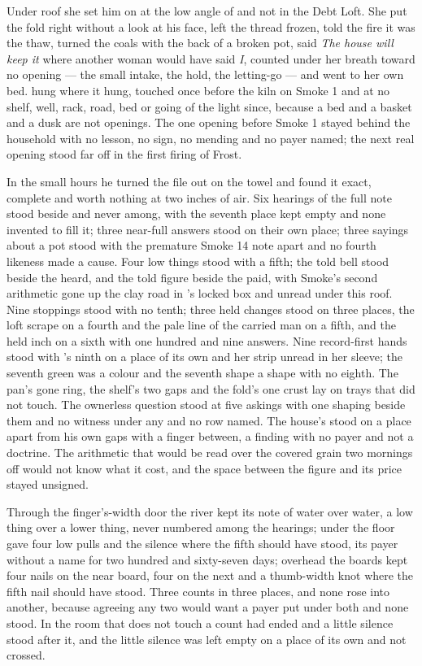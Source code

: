 Under  roof she set him on  at the low angle of  and not in the Debt Loft. She put the fold right without a look at his face, left the thread frozen, told the fire it was the thaw, turned the coals with the back of a broken pot, said \emph{The house will keep it} where another woman would have said \emph{I}, counted under her breath toward no opening --- the small intake, the hold, the letting-go --- and went to her own bed.  hung where it hung, touched once before the kiln on Smoke 1 and at no shelf, well, rack, road, bed or going of the light since, because a bed and a basket and a dusk are not openings. The one opening before Smoke 1 stayed behind the household with no lesson, no sign, no mending and no payer named; the next real opening stood far off in the first firing of Frost.

In the small hours he turned the file out on the towel and found it exact, complete and worth nothing at two inches of air. Six hearings of the full note stood beside and never among, with the seventh place kept empty and none invented to fill it; three near-full answers stood on their own place; three sayings about a pot stood with the premature Smoke 14 note apart and no fourth likeness made a cause. Four low things stood with  a fifth; the told bell stood beside the heard, and the told figure beside the paid, with Smoke's second arithmetic gone up the clay road in 's locked box and unread under this roof. Nine stoppings stood with no tenth; three held changes stood on three places, the loft scrape on a fourth and the pale line of the carried man on a fifth, and the held inch on a sixth with one hundred and nine answers. Nine record-first hands stood with 's ninth on a place of its own and her strip unread in her sleeve; the seventh green was a colour and the seventh shape a shape with no eighth. The pan's gone ring, the shelf's two gaps and the fold's one crust lay on trays that did not touch. The ownerless question stood at five askings with one shaping beside them and no witness under any and no row named. The house's  stood on a place apart from his own gaps with a finger between, a finding with no payer and not a doctrine. The arithmetic that would be read over the covered grain two mornings off would not know what it cost, and the space between the figure and its price stayed unsigned.

Through the finger's-width door the river kept its note of water over water, a low thing over a lower thing, never numbered among the hearings; under the floor  gave four low pulls and the silence where the fifth should have stood, its payer without a name for two hundred and sixty-seven days; overhead the boards kept four nails on the near board, four on the next and a thumb-width knot where the fifth nail should have stood. Three counts in three places, and none rose into another, because agreeing any two would want a payer put under both and none stood. In the room that does not touch a count had ended and a little silence stood after it, and the little silence was left empty on a place of its own and not crossed.

